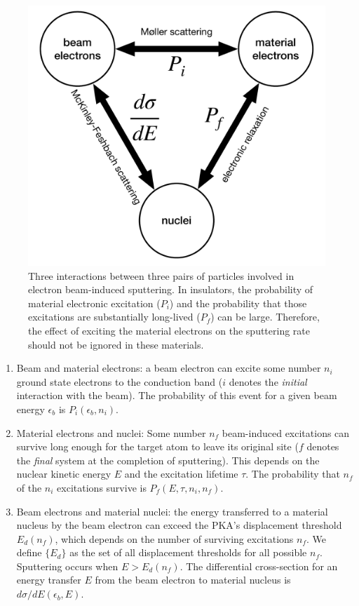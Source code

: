 \documentclass{article}
\begin{document}
\begin{figure}
  \centering
  \includegraphics[width=.7\textwidth]{fig1.pdf}
  \caption{
    Three interactions between three pairs of particles involved in electron
    beam-induced sputtering.
    In insulators, the probability of material electronic excitation ($P_i$)
    and the probability that those excitations are substantially long-lived
    ($P_f$) can be large.
    Therefore, the effect of exciting the material electrons on the sputtering
    rate should not be ignored in these materials.
  }
  \label{fig:triad}
\end{figure}

\begin{enumerate}
  \item Beam and material electrons:
    a beam electron can excite some number $n_i$ ground state electrons to the
    conduction band ($i$ denotes the \textit{initial} interaction with the
    beam).
    The probability of this event for a given beam energy $\epsilon_b$ is
    $P_i(\epsilon_b, n_i)$.
  \item Material electrons and nuclei:
    Some number $n_f$ beam-induced excitations can survive long enough for the
    target atom to leave its original site ($f$ denotes the \textit{final}
    system at the completion of sputtering).
    This depends on the nuclear kinetic energy $E$ and the excitation lifetime
    $\tau$.
    The probability that $n_f$ of the $n_i$ excitations survive is $P_f(E,
    \tau, n_i, n_f)$.
  \item Beam electrons and material nuclei: the energy transferred to a
    material nucleus by the beam electron can exceed the PKA's displacement
    threshold $E_d(n_f)$, which depends on the number of surviving excitations
    $n_f$.  We define $\{{E}_d\}$ as the set of all displacement thresholds for
    all possible $n_f$.  Sputtering occurs when $E>E_d(n_f)$.  The differential
    cross-section for an energy transfer $E$ from the beam electron to
    material nucleus is $d\sigma/dE(\epsilon_b, E)$.
\end{enumerate}
\end{document}
